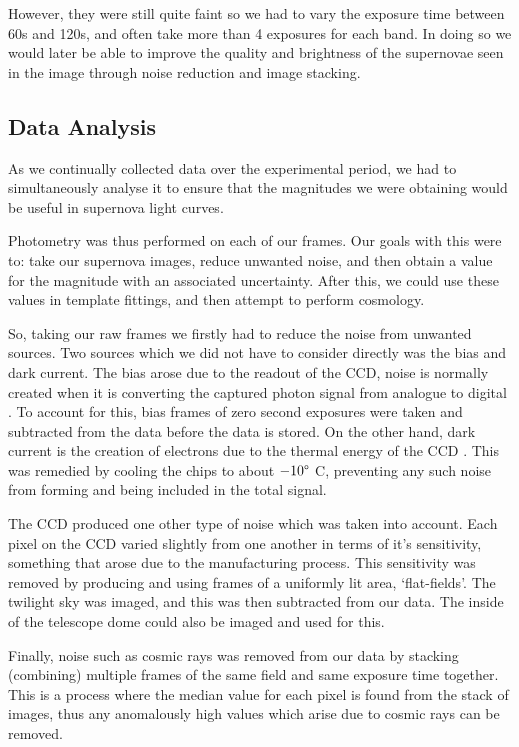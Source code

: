 \documentclass[twocolumn]{revtex4}
\begin{document}
However, they were still quite faint so we had to vary the exposure time between 60s and 120s, and often take more than 4 exposures for each band. In doing so we would later be able to improve the quality and brightness of the supernovae seen in the image through noise reduction and image stacking.

\vspace{-3ex}
\subsection{Data Analysis} \label{data_analysis}
\vspace{-2ex}
As we continually collected data over the experimental period, we had to simultaneously analyse it to ensure that the magnitudes we were obtaining would be useful in supernova light curves.

Photometry was thus performed on each of our frames. Our goals with this were to: take our supernova images, reduce unwanted noise, and then obtain a value for the magnitude with an associated uncertainty. After this, we could use these values in template fittings, and then attempt to perform cosmology.

So, taking our raw frames we firstly had to reduce the noise from unwanted sources. Two sources which we did not have to consider directly was the bias and dark current. The bias arose due to the readout of the CCD, noise is normally created when it is converting the captured photon signal from analogue to digital \cite{obs_uni}. To account for this, bias frames of zero second exposures were taken and subtracted from the data before the data is stored. On the other hand, dark current is the creation of electrons due to the thermal energy of the CCD \cite{obs_uni}. This was remedied by cooling the chips to about $-10\degree$ C, preventing any such noise from forming and being included in the total signal.

The CCD produced one other type of noise which was taken into account. Each pixel on the CCD varied slightly from one another in terms of it's sensitivity, something that arose due to the manufacturing process. This sensitivity was removed by producing and using frames of a uniformly lit area, `flat-fields'. The twilight sky was imaged, and this was then subtracted from our data. The inside of the telescope dome could also be imaged and used for this.
 
Finally, noise such as cosmic rays was removed from our data by stacking (combining) multiple frames of the same field and same exposure time together. This is a process where the median value for each pixel is found from the stack of images, thus any anomalously high values which arise due to cosmic rays can be removed.
\end{document}
